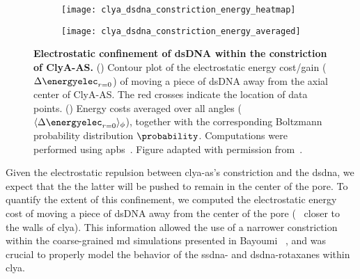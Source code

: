 \begin{figure*}[t]
  \centering
  \medskip
  \begin{subfigure}[t]{60mm}
    \centering
    \caption{}\vspace{-5mm}\hspace{1.5mm}\label{fig:clya_dsdna_constriction_energy_heatmap}
    \texttt{[image: clya\_dsdna\_constriction\_energy\_heatmap]}
  \end{subfigure}
  \hspace{-3mm}
  \begin{subfigure}[t]{60mm}
    \centering
    \caption{}\vspace{-5mm}\hspace{1.5mm}\label{fig:clya_dsdna_constriction_energy_averaged}
    \texttt{[image: clya\_dsdna\_constriction\_energy\_averaged]}
  \end{subfigure}

\caption[Electrostatic confinement of dsDNA within the constriction of ClyA-AS.]{%
  \textbf{Electrostatic confinement of dsDNA within the constriction of ClyA-AS.}
  ()
  Contour plot of the electrostatic energy cost/gain ($\Delta \energyelec_{r=0}$) of moving a piece of dsDNA
  away from the axial center of ClyA-AS. The red crosses indicate the location of data points.
  ()
  Energy costs averaged over all angles ($\langle \Delta \energyelec_{r=0} \rangle_{\phi}$), together with the
  corresponding Boltzmann probability distribution $\probability$.
  Computations were performed using \gls{apbs}~\cite{Baker-2001,Baker-2005}.
  Figure adapted with permission from~\cite{Bayoumi-2020}.
  }\label{fig:clya_dsdna_constriction}
\end{figure*}


Given the electrostatic repulsion between \gls{clya-as}'s constriction and the \gls{dsdna}, we expect that the
the latter will be pushed to remain in the center of the pore. To quantify the extent of this confinement, we
computed the electrostatic energy cost of moving a piece of dsDNA away from the center of the pore (\ie~
closer to the walls of \gls{clya}). This information allowed the use of a narrower constriction within the
coarse-grained \gls{md} simulations presented in Bayoumi \etal{}~\cite{Bayoumi-2020}, and was crucial to
properly model the behavior of the \gls{ssdna}- and \gls{dsdna}-rotaxanes within \gls{clya}.

